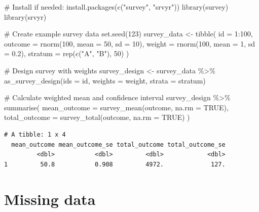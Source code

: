 \documentclass[
  letterpaper,
  DIV=11,
  numbers=noendperiod]{scrartcl}
\newenvironment{Shaded}{\begin{snugshade}}{\end{snugshade}}
\newcommand{\AttributeTok}[1]{\textcolor[rgb]{0.40,0.45,0.13}{#1}}
\newcommand{\CommentTok}[1]{\textcolor[rgb]{0.37,0.37,0.37}{#1}}
\newcommand{\ConstantTok}[1]{\textcolor[rgb]{0.56,0.35,0.01}{#1}}
\newcommand{\DecValTok}[1]{\textcolor[rgb]{0.68,0.00,0.00}{#1}}
\newcommand{\FloatTok}[1]{\textcolor[rgb]{0.68,0.00,0.00}{#1}}
\newcommand{\FunctionTok}[1]{\textcolor[rgb]{0.28,0.35,0.67}{#1}}
\newcommand{\NormalTok}[1]{\textcolor[rgb]{0.00,0.23,0.31}{#1}}
\newcommand{\OtherTok}[1]{\textcolor[rgb]{0.00,0.23,0.31}{#1}}
\newcommand{\SpecialCharTok}[1]{\textcolor[rgb]{0.37,0.37,0.37}{#1}}
\newcommand{\StringTok}[1]{\textcolor[rgb]{0.13,0.47,0.30}{#1}}
\begin{document}
\begin{Shaded}
\begin{Highlighting}[]
\CommentTok{\# Install if needed: install.packages(c("survey", "srvyr"))}
\FunctionTok{library}\NormalTok{(survey)}
\FunctionTok{library}\NormalTok{(srvyr)}

\CommentTok{\# Create example survey data}
\FunctionTok{set.seed}\NormalTok{(}\DecValTok{123}\NormalTok{)}
\NormalTok{survey\_data }\OtherTok{\textless{}{-}} \FunctionTok{tibble}\NormalTok{(}
  \AttributeTok{id =} \DecValTok{1}\SpecialCharTok{:}\DecValTok{100}\NormalTok{,}
  \AttributeTok{outcome =} \FunctionTok{rnorm}\NormalTok{(}\DecValTok{100}\NormalTok{, }\AttributeTok{mean =} \DecValTok{50}\NormalTok{, }\AttributeTok{sd =} \DecValTok{10}\NormalTok{),}
  \AttributeTok{weight =} \FunctionTok{rnorm}\NormalTok{(}\DecValTok{100}\NormalTok{, }\AttributeTok{mean =} \DecValTok{1}\NormalTok{, }\AttributeTok{sd =} \FloatTok{0.2}\NormalTok{),}
  \AttributeTok{stratum =} \FunctionTok{rep}\NormalTok{(}\FunctionTok{c}\NormalTok{(}\StringTok{"A"}\NormalTok{, }\StringTok{"B"}\NormalTok{), }\DecValTok{50}\NormalTok{)}
\NormalTok{)}

\CommentTok{\# Design survey with weights}
\NormalTok{survey\_design }\OtherTok{\textless{}{-}}\NormalTok{ survey\_data }\SpecialCharTok{\%\textgreater{}\%}
  \FunctionTok{as\_survey\_design}\NormalTok{(}\AttributeTok{ids =}\NormalTok{ id, }\AttributeTok{weights =}\NormalTok{ weight, }\AttributeTok{strata =}\NormalTok{ stratum)}

\CommentTok{\# Calculate weighted mean and confidence interval}
\NormalTok{survey\_design }\SpecialCharTok{\%\textgreater{}\%}
  \FunctionTok{summarise}\NormalTok{(}
    \AttributeTok{mean\_outcome =} \FunctionTok{survey\_mean}\NormalTok{(outcome, }\AttributeTok{na.rm =} \ConstantTok{TRUE}\NormalTok{),}
    \AttributeTok{total\_outcome =} \FunctionTok{survey\_total}\NormalTok{(outcome, }\AttributeTok{na.rm =} \ConstantTok{TRUE}\NormalTok{)}
\NormalTok{  )}
\end{Highlighting}
\end{Shaded}

\begin{verbatim}
# A tibble: 1 x 4
  mean_outcome mean_outcome_se total_outcome total_outcome_se
         <dbl>           <dbl>         <dbl>            <dbl>
1         50.8           0.908         4972.             127.
\end{verbatim}

\section{Missing data}\label{missing-data}
\end{document}
